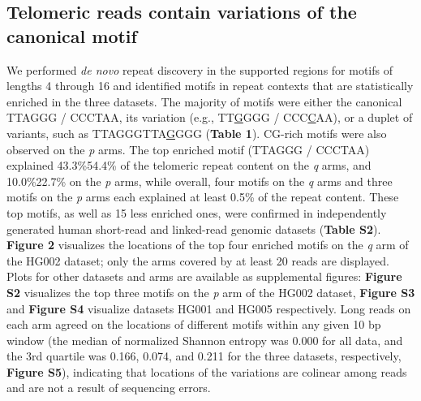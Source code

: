 \documentclass{article}
\begin{document}
\subsection*{Telomeric reads contain variations of the canonical motif}
We performed \textit{de novo} repeat discovery in the supported regions for motifs of lengths 4 through 16 and identified motifs in repeat contexts that are statistically enriched in the three datasets.
The majority of motifs were either the canonical TTAGGG / CCCTAA, its variation (e.g., TT\underline{G}GGG / CCC\underline{C}AA), or a duplet of variants, such as TTAGGGTTA\underline{G}GGG (\textbf{Table 1}).
CG-rich motifs were also observed on the \textit{p} arms.
The top enriched motif (TTAGGG / CCCTAA) explained 43.3\%\textendash{}54.4\% of the telomeric repeat content on the \textit{q} arms, and 10.0\%\textendash{}22.7\% on the \textit{p} arms, while overall, four motifs on the \textit{q} arms and three motifs on the \textit{p} arms each explained at least 0.5\% of the repeat content.
These top motifs, as well as 15 less enriched ones, were confirmed in independently generated human short-read and linked-read genomic datasets (\textbf{Table S2}).
\textbf{Figure 2} visualizes the locations of the top four enriched motifs on the \textit{q} arm of the HG002 dataset; only the arms covered by at least 20 reads are displayed.
Plots for other datasets and arms are available as supplemental figures: \textbf{Figure S2} visualizes the top three motifs on the \textit{p} arm of the HG002 dataset, \textbf{Figure S3} and \textbf{Figure S4} visualize datasets HG001 and HG005 respectively.
Long reads on each arm agreed on the locations of different motifs within any given 10 bp window (the median of normalized Shannon entropy was 0.000 for all data, and the 3rd quartile was 0.166, 0.074, and 0.211 for the three datasets, respectively, \textbf{Figure S5}), indicating that locations of the variations are colinear among reads and are not a result of sequencing errors.
\end{document}
